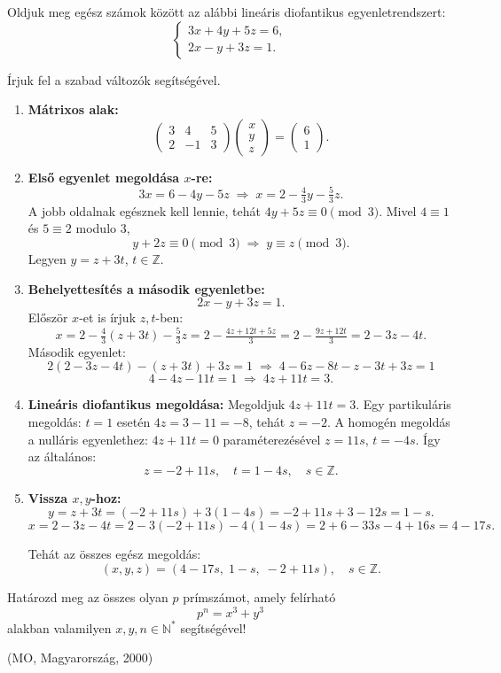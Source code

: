\begin{extraproblem}
Oldjuk meg egész számok között az alábbi lineáris diofantikus egyenletrendszert:
\[
\begin{cases}
3x+4y+5z=6,\\
2x-y+3z=1.
\end{cases}
\]
\end{extraproblem}

\vspace{1em}

\begin{solution}
Írjuk fel a szabad változók segítségével.
\begin{enumerate}
\item \textbf{Mátrixos alak:} 
\[
\begin{pmatrix}3 & 4 & 5\\
2 & -1 & 3
\end{pmatrix}\begin{pmatrix}x\\
y\\
z
\end{pmatrix}=\begin{pmatrix}6\\
1
\end{pmatrix}.
\]
\item \textbf{Első egyenlet megoldása $x$-re:} 
\[
3x=6-4y-5z\;\Rightarrow\;x=2-\tfrac{4}{3}y-\tfrac{5}{3}z.
\]
A jobb oldalnak egésznek kell lennie, tehát $4y+5z\equiv0\pmod 3$.
Mivel $4\equiv1$ és $5\equiv2$ modulo 3, 
\[
y+2z\equiv0\pmod 3\;\Longrightarrow\;y\equiv z\pmod 3.
\]
Legyen $y=z+3t$, $t\in\mathbb{Z}$.
\item \textbf{Behelyettesítés a második egyenletbe:} 
\[
2x-y+3z=1.
\]
Először $x$-et is írjuk $z,t$-ben: 
\[
x=2-\tfrac{4}{3}(z+3t)-\tfrac{5}{3}z=2-\tfrac{4z+12t+5z}{3}=2-\tfrac{9z+12t}{3}=2-3z-4t.
\]
Második egyenlet: 
\[
2(2-3z-4t)-(z+3t)+3z=1\;\Longrightarrow\;4-6z-8t-z-3t+3z=1
\]
\[
4-4z-11t=1\;\Longrightarrow\;4z+11t=3.
\]
\item \textbf{Lineáris diofantikus megoldása:} Megoldjuk $4z+11t=3$. Egy
partikuláris megoldás: $t=1$ esetén $4z=3-11=-8$, tehát $z=-2$.
A homogén megoldás a nulláris egyenlethez: $4z+11t=0$ paraméterezésével
$z=11s$, $t=-4s$. Így az általános: 
\[
z=-2+11s,\quad t=1-4s,\quad s\in\mathbb{Z}.
\]
\item \textbf{Vissza $x,y$-hoz:} 
\[
y=z+3t=(-2+11s)+3(1-4s)=-2+11s+3-12s=1-s.
\]
\[
x=2-3z-4t=2-3(-2+11s)-4(1-4s)=2+6-33s-4+16s=4-17s.
\]

Tehát az összes egész megoldás: 
\[
\boxed{(x,y,z)=(4-17s,\;1-s,\;-2+11s),\quad s\in\mathbb{Z}.}
\]

\end{enumerate}
\end{solution}
\begin{extraproblem}
Határozd meg az összes olyan $p$ prímszámot, amely felírható 
\[
p^{n}=x^{3}+y^{3}
\]
alakban valamilyen $x,y,n\in\mathbb{N}^{*}$ segítségével! 
\begin{flushright}
(MO, Magyarország, 2000) 
\par\end{flushright}
\end{extraproblem}


